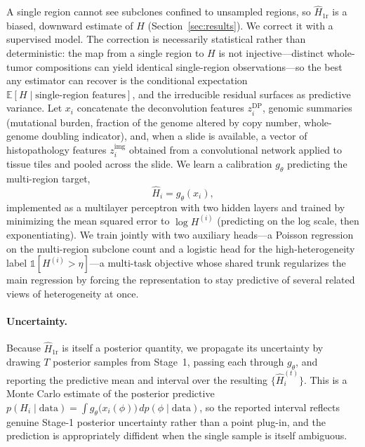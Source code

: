 \documentclass{article}
\begin{document}
A single region cannot see subclones confined to unsampled regions, so
$\hat H_{\text{1r}}$ is a biased, downward estimate of $H$
(Section~\ref{sec:results}). We correct it with a supervised model. The correction is
necessarily statistical rather than deterministic: the map from a single region to $H$
is not injective---distinct whole-tumor compositions can yield identical single-region
observations---so the best any estimator can recover is the conditional expectation
$\mathbb{E}[H \mid \text{single-region features}]$, and the irreducible residual
surfaces as predictive variance. Let $x_i$
concatenate the deconvolution features $z^{\text{DP}}_i$, genomic summaries
(mutational burden, fraction of the genome altered by copy number, whole-genome
doubling indicator), and, when a slide is available, a vector of histopathology
features $z^{\text{img}}_i$ obtained from a convolutional network
\citep{He2016} applied to tissue tiles and pooled across the slide. We learn a
calibration $g_\theta$ predicting the multi-region target,
\begin{equation}
\hat H_i = g_\theta(x_i),
\end{equation}
implemented as a multilayer perceptron with two hidden layers and trained by
minimizing the mean squared error to $\log H^{(i)}$ (predicting on the log scale, then
exponentiating). We train jointly with two auxiliary heads---a Poisson regression on
the multi-region subclone count and a logistic head for the high-heterogeneity label
$\mathbb{1}[H^{(i)} > \eta]$---a multi-task objective \citep{Caruana1997} whose shared
trunk regularizes the main regression by forcing the representation to stay predictive
of several related views of heterogeneity at once.

\paragraph{Uncertainty.} Because $\hat H_{\text{1r}}$ is itself a posterior quantity,
we propagate its uncertainty by drawing $T$ posterior samples from Stage~1, passing
each through $g_\theta$, and reporting the predictive mean and interval over the
resulting $\{\hat H_i^{(t)}\}$. This is a Monte Carlo estimate of the posterior
predictive $p(H_i \mid \text{data}) = \int g_\theta\big(x_i(\phi)\big)\, dp(\phi \mid
\text{data})$, so the reported interval reflects genuine Stage-1 posterior uncertainty
rather than a point plug-in, and the prediction is appropriately diffident when the
single sample is itself ambiguous.
\end{document}
